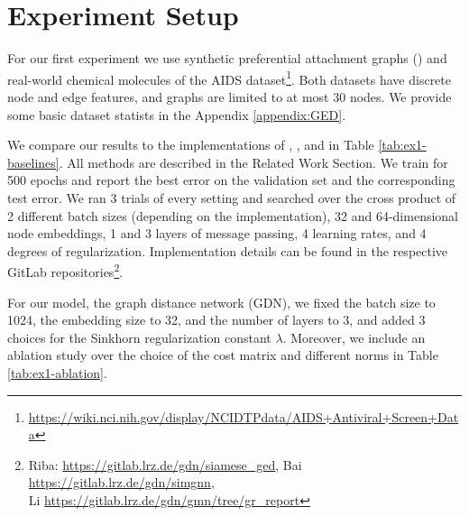 \section{Experiment Setup}

For our first experiment we use synthetic preferential attachment graphs (\citealp{pref_att2002}) and real-world chemical molecules of the AIDS dataset\footnote{\url{https://wiki.nci.nih.gov/display/NCIDTPdata/AIDS+Antiviral+Screen+Data}}. Both datasets have discrete node and edge features, and graphs are limited to at most 30 nodes. We provide some basic dataset statists in the Appendix \ref{appendix:GED}.

We compare our results to the implementations of \cite{riba2018}, \cite{bai2019}, and \cite{li2019} in Table \ref{tab:ex1-baselines}. All methods are described in the Related Work Section. We train for 500 epochs and report the best error on the validation set and the corresponding test error. We ran 3 trials of every setting and searched over the cross product of 2 different batch sizes (depending on the implementation), 32 and 64-dimensional node embeddings, 1 and 3 layers of message passing, 4 learning rates, and 4 degrees of regularization. Implementation details can be found in the respective GitLab repositories\footnote{Riba: \url{https://gitlab.lrz.de/gdn/siamese_ged}, Bai \url{https://gitlab.lrz.de/gdn/simgnn}, \\Li \url{https://gitlab.lrz.de/gdn/gmn/tree/gr_report}}.

For our model, the graph distance network (GDN), we fixed the batch size to 1024, the embedding size to 32, and the number of layers to 3, and added 3 choices for the Sinkhorn regularization constant $\lambda$. Moreover, we include an ablation study over the choice of the cost matrix and different norms in Table \ref{tab:ex1-ablation}.
